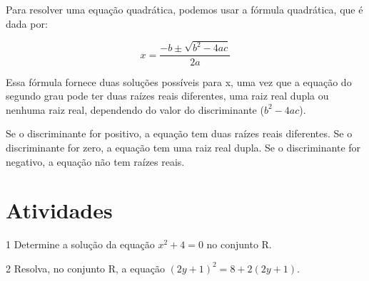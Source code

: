 {{Para resolver uma equação quadrática, podemos usar a fórmula quadrática, que é dada por:

$$x = \frac{-b \pm \sqrt{b^2 - 4ac}}{2a}$$
 
Essa fórmula fornece duas soluções possíveis para x, uma vez que a equação do segundo grau pode ter duas raízes
reais diferentes, uma raiz real dupla ou nenhuma raiz real, dependendo do valor do discriminante ($b^2 - 4ac$).

Se o discriminante for positivo, a equação tem duas raízes reais diferentes.
Se o discriminante for zero, a equação tem uma raiz real dupla.
Se o discriminante for negativo, a equação não tem raízes reais.}



\section*{Atividades}

\num{1} Determine a solução da equação $x^2 + 4 = 0$ no conjunto R.





\num{2} Resolva, no conjunto R, a equação $(2y + 1)^2 = 8 + 2(2y + 1)$.




}
